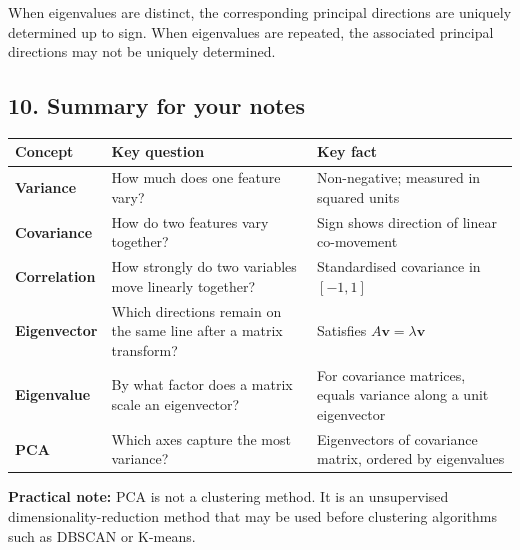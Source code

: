 \documentclass[11pt]{article}
\begin{document}
When eigenvalues are distinct, the corresponding principal directions
are uniquely determined up to sign. When eigenvalues are repeated, the
associated principal directions may not be uniquely determined.



    \subsection{10. Summary for your notes}\label{summary-for-your-notes}

{\def\LTcaptype{none} %
\begin{longtable}[]{@{}
  >{\raggedright\arraybackslash}p{}
  >{\raggedright\arraybackslash}p{}
  >{\raggedright\arraybackslash}p{}@{}}
\toprule\noalign{}
\begin{minipage}[b]{\linewidth}\raggedright
Concept
\end{minipage} & \begin{minipage}[b]{\linewidth}\raggedright
Key question
\end{minipage} & \begin{minipage}[b]{\linewidth}\raggedright
Key fact
\end{minipage} \\
\midrule\noalign{}
\endhead
\bottomrule\noalign{}
\endlastfoot
\textbf{Variance} & How much does one feature vary? & Non-negative;
measured in squared units \\
\textbf{Covariance} & How do two features vary together? & Sign shows
direction of linear co-movement \\
\textbf{Correlation} & How strongly do two variables move linearly
together? & Standardised covariance in \([-1,1]\) \\
\textbf{Eigenvector} & Which directions remain on the same line after a
matrix transform? & Satisfies \(A\mathbf v=\lambda\mathbf v\) \\
\textbf{Eigenvalue} & By what factor does a matrix scale an eigenvector?
& For covariance matrices, equals variance along a unit eigenvector \\
\textbf{PCA} & Which axes capture the most variance? & Eigenvectors of
covariance matrix, ordered by eigenvalues \\
\end{longtable}
}

\textbf{Practical note:} PCA is not a clustering method. It is an
unsupervised dimensionality-reduction method that may be used before
clustering algorithms such as DBSCAN or K-means.



    
    
    
\end{document}
